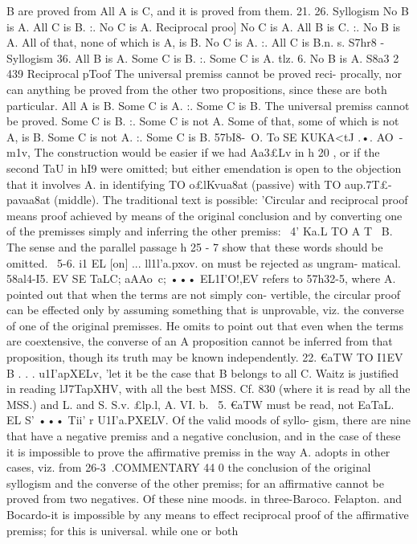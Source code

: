 B are proved from All A is C, and it is proved from them.
21.
26.
Syllogism
No B is A.
All C is B.
:. No C is A.
Reciprocal proo]
No C is A.
All B is C.
:. No B is A.
All of that, none of which is A, is B.
No C is A.
:. All C is B.n. s. S7hr8 -
Syllogism
36.
All B is A.
Some C is B.
:. Some C is A.
tlz.
6. No B is A.
S8a3 2
439
Reciprocal pToof
The universal premiss cannot be proved reci-
procally, nor can anything be proved from
the other two propositions, since these are
both particular.
All A is B.
Some C is A.
:. Some C is B.
The universal premiss cannot be proved.
Some C is B.
:. Some C is not A.
Some of that, some of which is not A, is B.
Some C is not A.
:. Some C is B.
57bI8-~O. To SE KUKA<tJ .•. AO~-m1v, The construction would
be easier if we had Aa{3£Lv in h 20 , or if the second TaU in hI9 were
omitted; but either emendation is open to the objection that it
involves A. in identifying TO o£lKvua8at (passive) with TO aup.7T£-
pavaa8at (middle). The traditional text is possible: 'Circular and
reciprocal proof means proof achieved by means of the original
conclusion and by converting one of the premisses simply and
inferring the other premiss:
~4' Ka.L TO A T~ B. The sense and the parallel passage h 25 - 7
show that these words should be omitted.
~5-6. i1 EL [on] ... ll1l'a.pxov. on must be rejected as ungram-
matical.
58al4-I5. EV SE TaLC; aAAo~c; ••• EL1I'O!,EV refers to 57h32-5,
where A. pointed out that when the terms are not simply con-
vertible, the circular proof can be effected only by assuming
something that is unprovable, viz. the converse of one of the
original premisses. He omits to point out that even when the
terms are coextensive, the converse of an A proposition cannot be
inferred from that proposition, though its truth may be known
independently.
22. €aTW TO I1EV B . . . u1I'apXELv, 'let it be the case that B
belongs to all C. Waitz is justified in reading lJ7TapXHV, with all
the best MSS. Cf. 830 (where it is read by all the MSS.) and L. and
S. S.v. £lp.l, A. VI. b.
~5. €aTW
must be read, not EaTaL.
EL S' ••• Tii' r U1I'a.PXELV. Of the valid moods of syllo-
gism, there are nine that have a negative premiss and a negative
conclusion, and in the case of these it is impossible to prove the
affirmative premiss in the way A. adopts in other cases, viz. from
26-3~.COMMENTARY
44 0
the conclusion of the original syllogism and the converse of the
other premiss; for an affirmative cannot be proved from two
negatives. Of these nine moods. in three-Baroco. Felapton. and
Bocardo-it is impossible by any means to effect reciprocal proof
of the affirmative premiss; for this is universal. while one or both
}
